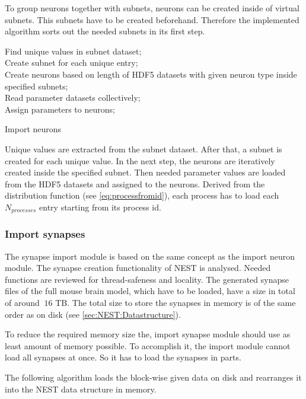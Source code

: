 To group neurons together with subnets, neurons can be created inside of virtual subnets.
This subnets have to be created beforehand.
Therefore the implemented algorithm sorts out the needed subnets in its first step.
\begin{algorithm}[ht!]
 Find unique values in subnet dataset; \\
 Create subnet for each unique entry; \\
 Create neurons based on length of HDF5 datasets with given neuron type inside specified subnets; \\
 Read parameter datasets collectively; \\
 Assign parameters to neurons;
\label{alg2}
\caption{Import neurons}
\end{algorithm}
Unique values are extracted from the subnet dataset.
After that, a subnet is created for each unique value. 
In the next step, the neurons are iteratively created inside the specified subnet.
Then needed parameter values are loaded from the HDF5 datasets and assigned to the neurons.
Derived from the distribution function (see \ref{eq:processfromid}), each process has to load each $N_{processes}$
entry starting from its process id.

\newpage
\subsubsection{Import synapses}
The synapse import module is based on the same concept as the import neuron module.
The synapse creation functionality of NEST is analysed.
Needed functions are reviewed for thread-safeness and locality.
The generated synapse files of the full mouse brain model, which have to be loaded, have a size in total of around $~16$ TB.
The total size to store the synapses in memory is of the same order as on disk (see \ref{sec:NEST:Datastructure}).

To reduce the required memory size the, import synapse module should use as least amount of memory possible.
To accomplish it, the import module cannot load all synapses at once.
So it has to load the synapses in parts.

The following algorithm loads the block-wise given data on disk and rearranges it into
the NEST data structure in memory.

